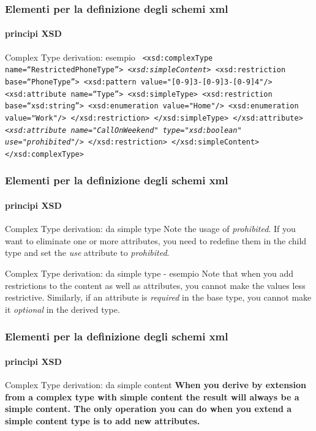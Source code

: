 
\begin{frame}
	\frametitle{Elementi per la definizione degli schemi xml}
	\framesubtitle{principi XSD}
	\addtocounter{nframe}{1}

	\begin{block}{Complex Type derivation: esempio}
		\texttt{
		<xsd:complexType name=``RestrictedPhoneType''>
		\emph{<xsd:simpleContent>}
		<xsd:restriction base=``PhoneType''>
		<xsd:pattern value="[0-9]{3}-[0-9]{3}-[0-9]{4}"/>
		<xsd:attribute name=``Type''>
		<xsd:simpleType>
		<xsd:restriction base=``xsd:string''>
		<xsd:enumeration value="Home"/>
		<xsd:enumeration value="Work"/>
		</xsd:restriction>
		</xsd:simpleType>
		</xsd:attribute>
		\textit{<xsd:attribute name="CallOnWeekend" type="xsd:boolean" use="prohibited"/> }
		</xsd:restriction>
		</xsd:simpleContent>
		</xsd:complexType>
		}
	\end{block}
\end{frame}


\begin{frame}
	\frametitle{Elementi per la definizione degli schemi xml}
	\framesubtitle{principi XSD}
	\addtocounter{nframe}{1}

	\begin{block}{Complex Type derivation: da simple type}
		Note the usage of \textit{prohibited}. If you want to eliminate one or more attributes, you need to redefine them in the child type and set the \textit{use} attribute to \textit{prohibited}.
	\end{block}

	\begin{block}{Complex Type derivation: da simple type - esempio}
		Note that when you add restrictions to the content as well as attributes, you cannot make the values less restrictive. Similarly, if an attribute is \textit{required} in the base type, you cannot make it \textit{optional} in the derived type.
	\end{block}
\end{frame}

\begin{frame}
	\frametitle{Elementi per la definizione degli schemi xml}
	\framesubtitle{principi XSD}
	\addtocounter{nframe}{1}

	\begin{block}{Complex Type derivation: da simple content}
		\textbf{When you derive by extension from a complex type with simple content the result will always be a simple content. The only operation you can do when you extend a simple content type is to add new attributes.}
	\end{block}

\end{frame}




